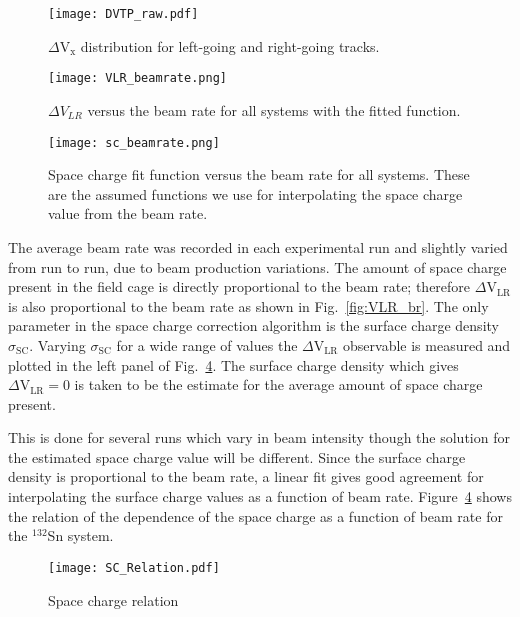 \begin{figure}[!htb]
\centering
\texttt{[image: DVTP\_raw.pdf]}
\caption{$\Delta\mathrm{V}_\mathrm{x}$ distribution for left-going and right-going tracks. }
\label{fig:VLR}
\end{figure}



\begin{figure}[!htb]
\centering
\texttt{[image: VLR\_beamrate.png]}
\caption{ $\Delta V_{LR}$ versus the beam rate for all systems with the fitted function.}
\label{fig:vlr_br}
\end{figure}



\begin{figure}[!htb]
\centering
\texttt{[image: sc\_beamrate.png]}
\caption{Space charge fit function versus the beam rate for all systems. These are the assumed functions we use for interpolating the space charge value from the beam rate.}
\label{fig:spacechg_br_all}
\end{figure}

The average beam rate was recorded in each experimental run and slightly varied from run to run, due to beam production variations. The amount of space charge present in the field cage is directly proportional to the beam rate; therefore $\Delta\mathrm{V}_\mathrm{LR}$ is also proportional to the beam rate as shown in Fig.~\ref{fig:VLR_br}. The only parameter in the space charge correction algorithm is the surface charge density $\sigma_{\mathrm{SC}}$. Varying $\sigma_{\mathrm{SC}}$ for a wide range of values the $\Delta\mathrm{V}_\mathrm{LR}$ observable is measured and plotted in the left panel of Fig.~\ref{fig:spacechg_relation}. The surface charge density which gives $\Delta\mathrm{V}_\mathrm{LR} = 0$ is taken to be the estimate for the average amount of space charge present. 

This is done for several runs which vary in beam intensity though the solution for the estimated space charge value will be different. Since the surface charge density is proportional to the beam rate, a linear fit gives good agreement for interpolating the surface charge values as a function of beam rate. Figure~\ref{fig:spacechg_relation} shows the relation of the dependence of the space charge as a function of beam rate for the ${}^{132}$Sn system.

\begin{figure}[!htb]
\texttt{[image: SC\_Relation.pdf]}
\caption{Space charge relation}
\label{fig:spacechg_relation}
\end{figure}


